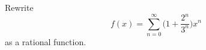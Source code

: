 Rewrite
\[
f(x) = \sum_{n=0}^\infty \biggl( 1 + \frac{2^n}{3^n}  \biggr) x^n
\]
as a rational function.
